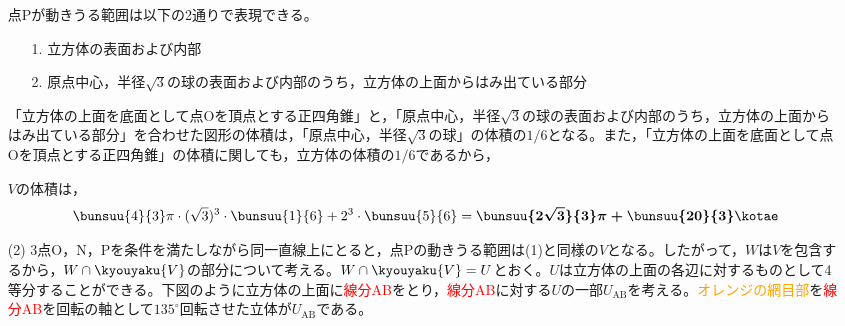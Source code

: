 \documentclass[../../../doc/main]{subfiles}
\begin{document}
\begin{itemize}
\begin{mawarikomi}{}
{
            }
                点Pが動きうる範囲は以下の2通りで表現できる。
                \begin{itemize}
                    \item [1.] 立方体の表面および内部
                    \item [2.] 原点中心，半径$\sqrt{3}$の球の表面および内部のうち，立方体の上面からはみ出ている部分
                \end{itemize}
                「立方体の上面を底面として点Oを頂点とする正四角錐」と，「原点中心，半径$\sqrt{3}$の球の表面および内部のうち，立方体の上面からはみ出ている部分」を合わせた図形の体積は，「原点中心，半径$\sqrt{3}$の球」の体積の$1/6$となる。また，「立方体の上面を底面として点Oを頂点とする正四角錐」の体積に関しても，立方体の体積の$1/6$であるから，
            \end{mawarikomi}
            $V$の体積は，
            \begin{align*}
                \bunsuu{4}{3}\pi\cdot(\sqrt{3})^3\cdot\bunsuu{1}{6}+2^3\cdot\bunsuu{5}{6}=\boldsymbol{\bunsuu{2\sqrt{3}}{3}\pi+\bunsuu{20}{3}}\kotae
            \end{align*}
            \item [(2)]
                3点O，N，Pを条件を満たしながら同一直線上にとると，点Pの動きうる範囲は(1)と同様の$V$となる。したがって，$W$は$V$を包含するから，$W\cap\kyouyaku{V}$の部分について考える。$W\cap\kyouyaku{V}=U$とおく。$U$は立方体の上面の各辺に対するものとして4等分することができる。下図のように立方体の上面に\textcolor{red}{線分AB}をとり，\textcolor{red}{線分AB}に対する$U$の一部$U_{\text{AB}}$を考える。\textcolor{orange}{オレンジの網目部}を\textcolor{red}{線分AB}を回転の軸として$135^\circ$回転させた立体が$U_{\text{AB}}$である。

\end{itemize}
\end{document}
